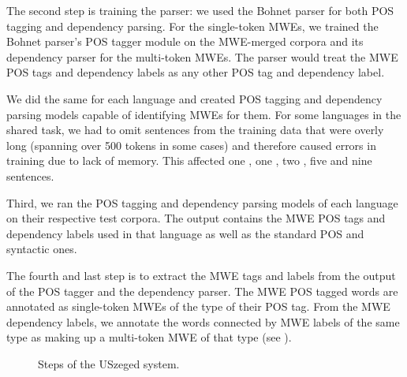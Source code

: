 \documentclass[output=paper,modfonts]{langscibook}
\begin{document}
The second step is training the parser: we used the Bohnet parser \citep{bohnet:2010:PAPERS} for both POS tagging and dependency parsing. For the single-token MWEs, we trained the Bohnet parser's POS tagger module on the MWE-merged corpora and its dependency parser for the multi-token MWEs. The parser would treat the MWE POS tags and dependency labels as any other POS tag and dependency label. 

We did the same for each language and created POS tagging and dependency parsing models capable of identifying MWEs for them. For some languages in the shared task, we had to omit sentences from the training data that were overly long (spanning over 500 tokens in some cases) and therefore caused errors in training due to lack of memory. This affected one , one , two , five  and nine  sentences.

Third, we ran the POS tagging and dependency parsing models of each language on their respective test corpora. The output contains the MWE POS tags and dependency labels used in that language as well as the standard POS and syntactic ones.

The fourth and last step is to extract the MWE tags and labels from the output of the POS tagger and the dependency parser. The MWE POS tagged words are annotated as single-token MWEs of the type of their POS tag. From the MWE dependency labels, we annotate the words connected by MWE labels of the same type as making up a multi-token MWE of that type (see ).

\begin{figure}
\vspace{2em}
\hspace{1em}
\caption{Steps of the USzeged system.}
\label{szeged}
\end{figure}
\end{document}
